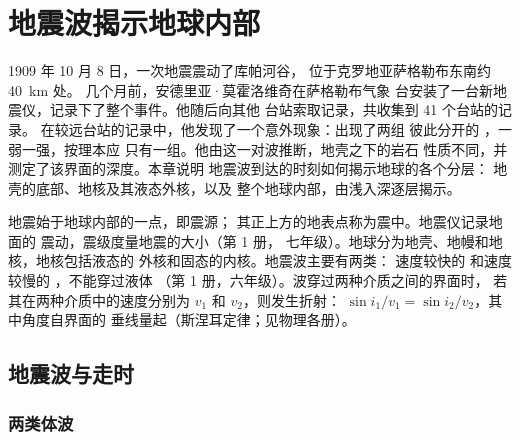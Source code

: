 \chapter{地震波揭示地球内部}\label{ch:g11:seismic-structure}

1909 年 10 月 8 日，一次地震震动了库帕河谷，
位于克罗地亚萨格勒布东南约 \qty{40}{km} 处。
几个月前，安德里亚·莫霍洛维奇在萨格勒布气象
台安装了一台新地震仪，记录下了整个事件。他随后向其他
台站索取记录，共收集到 41 个台站的记录。
在较远台站的记录中，他发现了一个意外现象：出现了两组
彼此分开的 ，一弱一强，按理本应
只有一组。他由这一对波推断，地壳之下的岩石
性质不同，并测定了该界面的深度。本章说明
地震波到达的时刻如何揭示地球的各个分层：
地壳的底部、地核及其液态外核，以及
整个地球内部，由浅入深逐层揭示。

\begin{recall}
地震始于地球内部的一点，即震源；
其正上方的地表点称为震中。地震仪记录地面的
震动，震级度量地震的大小（第 1 册，
七年级）。地球分为地壳、地幔和地核，地核包括液态的
外核和固态的内核。地震波主要有两类：
速度较快的 和速度较慢的 ，不能穿过液体
（第 1 册，六年级）。波穿过两种介质之间的界面时，
若其在两种介质中的速度分别为 $v_1$ 和 $v_2$，则发生折射：
$\sin i_1/v_1 = \sin i_2/v_2$，其中角度自界面的
垂线量起（斯涅耳定律；见物理各册）。
\end{recall}

\section{地震波与走时}

\subsection{两类体波}

